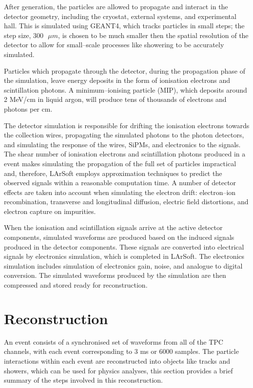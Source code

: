 After generation, the particles are allowed to propagate and interact in the 
detector geometry, including the cryostat, external systems, and experimental
hall. This is simulated using GEANT4\cite{Agostinelli:2002hh}, which tracks 
particles in small steps; the step size, $300 \mbox{ } \mu m$, is chosen to be much 
smaller then the spatial resolution of the detector to allow for small--scale 
processes like showering to be accurately simulated. 

Particles which propagate through the detector, during the propagation phase of
the simulation, leave energy deposits in the form of ionisation electrons and
scintillation photons. A minimum--ionising particle (MIP), which deposits 
around 2 MeV/cm in liquid argon, will produce tens of thousands of electrons 
and photons per cm.

The detector simulation is responsible for drifting the ionisation electrons 
towards the collection wires, propagating the simulated photons to the photon 
detectors, and simulating the response of the wires, SiPMs, and electronics to 
the signals. The shear number of ionisation electrons and scintillation 
photons produced in a \protodune{} event makes simulating the propagation of 
the full set of particles impractical and, therefore, LArSoft employs 
approximation techniques to predict the observed signals within a reasonable 
computation time. A number of detector effects are taken into account when 
simulating the electron drift: electron--ion recombination, transverse and 
longitudinal diffusion, electric field distortions, and electron capture on 
impurities. 

When the ionisation and scintillation signals arrive at the active detector 
components, simulated waveforms are produced based on the induced signals 
produced in the detector components. These signals are converted into 
electrical signals by electronics simulation, which is completed in LArSoft. 
The electronics simulation includes simulation of electronics gain, noise, 
and analogue to digital conversion. The simulated waveforms produced by the 
\protodune{} simulation are then compressed and stored ready for reconstruction.

\section{Reconstruction} \label{sec:reconstruction}

An event consists of a synchronised set of waveforms from all of the TPC 
channels, with each event corresponding to 3 ms or 6000 samples. The particle
interactions within each event are reconstructed into objects like tracks and
showers, which can be used for physics analyses, this section provides a brief 
summary of the steps involved in this reconstruction.

